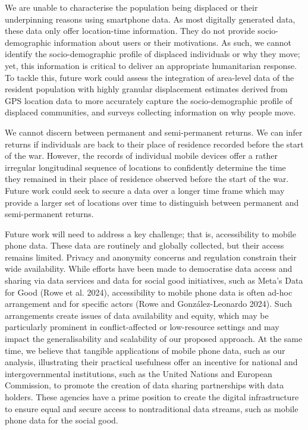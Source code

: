 \documentclass[
  sn-nature,
  11pt,
]{sn-jnl}
\begin{document}
We are unable to characterise the population being displaced or their
underpinning reasons using smartphone data. As most digitally generated
data, these data only offer location-time information. They do not
provide socio-demographic information about users or their motivations.
As such, we cannot identify the socio-demographic profile of displaced
individuals or why they move; yet, this information is critical to
deliver an appropriate humanitarian response. To tackle this, future
work could assess the integration of area-level data of the resident
population with highly granular displacement estimates derived from GPS
location data to more accurately capture the socio-demographic profile
of displaced communities, and surveys collecting information on why
people move.

We cannot discern between permanent and semi-permanent returns. We can
infer returns if individuals are back to their place of residence
recorded before the start of the war. However, the records of individual
mobile devices offer a rather irregular longitudinal sequence of
locations to confidently determine the time they remained in their place
of residence observed before the start of the war. Future work could
seek to secure a data over a longer time frame which may provide a
larger set of locations over time to distinguish between permanent and
semi-permanent returns.

Future work will need to address a key challenge; that is, accessibility
to mobile phone data. These data are routinely and globally collected,
but their access remains limited. Privacy and anonymity concerns and
regulation constrain their wide availability. While efforts have been
made to democratise data access and sharing via data services and data
for social good initiatives, such as Meta's Data for Good (Rowe et al.
2024), accessibility to mobile phone data is often ad-hoc arrangement
and for specific actors (Rowe and González-Leonardo 2024). Such
arrangements create issues of data availability and equity, which may be
particularly prominent in conflict-affected or low-resource settings and
may impact the generalisability and scalability of our proposed
approach. At the same time, we believe that tangible applications of
mobile phone data, such as our analysis, illustrating their practical
usefulness offer an incentive for national and intergovernmental
institutions, such as the United Nations and European Commission, to
promote the creation of data sharing partnerships with data holders.
These agencies have a prime position to create the digital
infrastructure to ensure equal and secure access to nontraditional data
streams, such as mobile phone data for the social good.
\end{document}
